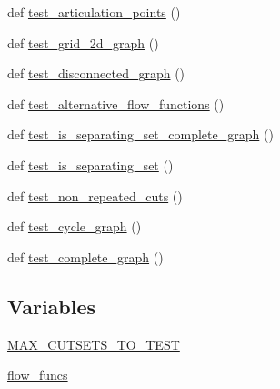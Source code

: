 \begin{DoxyCompactItemize}
\item 
def \hyperlink{namespacenetworkx_1_1algorithms_1_1connectivity_1_1tests_1_1test__kcutsets_a23d3ae8634d4611f6ca63329df24bac2}{test\+\_\+articulation\+\_\+points} ()
\item 
def \hyperlink{namespacenetworkx_1_1algorithms_1_1connectivity_1_1tests_1_1test__kcutsets_a1d1c5b9c36359e495f6db24047d13089}{test\+\_\+grid\+\_\+2d\+\_\+graph} ()
\item 
def \hyperlink{namespacenetworkx_1_1algorithms_1_1connectivity_1_1tests_1_1test__kcutsets_a0b411fba335a399a5264a4af4309aa3a}{test\+\_\+disconnected\+\_\+graph} ()
\item 
def \hyperlink{namespacenetworkx_1_1algorithms_1_1connectivity_1_1tests_1_1test__kcutsets_a63cb14e7318c932ef8415e1b326f4e71}{test\+\_\+alternative\+\_\+flow\+\_\+functions} ()
\item 
def \hyperlink{namespacenetworkx_1_1algorithms_1_1connectivity_1_1tests_1_1test__kcutsets_a8613a69f74a9ce5cad206a17a992a19a}{test\+\_\+is\+\_\+separating\+\_\+set\+\_\+complete\+\_\+graph} ()
\item 
def \hyperlink{namespacenetworkx_1_1algorithms_1_1connectivity_1_1tests_1_1test__kcutsets_a7886134ae31c7f3b25e9b374a65d387a}{test\+\_\+is\+\_\+separating\+\_\+set} ()
\item 
def \hyperlink{namespacenetworkx_1_1algorithms_1_1connectivity_1_1tests_1_1test__kcutsets_acfd1cb0ce0ecd687e820ce52c868b1af}{test\+\_\+non\+\_\+repeated\+\_\+cuts} ()
\item 
def \hyperlink{namespacenetworkx_1_1algorithms_1_1connectivity_1_1tests_1_1test__kcutsets_a1df87907e52810e7b956a644a09b121f}{test\+\_\+cycle\+\_\+graph} ()
\item 
def \hyperlink{namespacenetworkx_1_1algorithms_1_1connectivity_1_1tests_1_1test__kcutsets_aefd9ce5e3747a3c3ec1a02fcaff5bee9}{test\+\_\+complete\+\_\+graph} ()
\end{DoxyCompactItemize}
\subsection*{Variables}
\begin{DoxyCompactItemize}
\item 
\hyperlink{namespacenetworkx_1_1algorithms_1_1connectivity_1_1tests_1_1test__kcutsets_a12dc46649d77672f2d11c66cf12ec9e0}{M\+A\+X\+\_\+\+C\+U\+T\+S\+E\+T\+S\+\_\+\+T\+O\+\_\+\+T\+E\+ST}
\item 
\hyperlink{namespacenetworkx_1_1algorithms_1_1connectivity_1_1tests_1_1test__kcutsets_ab73f05645af44945b817351deb40f1f5}{flow\+\_\+funcs}
\end{DoxyCompactItemize}


